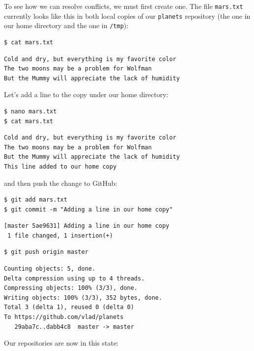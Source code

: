 \documentclass{book}
\begin{document}
To see how we can resolve conflicts, we must first create one. The file
\texttt{mars.txt} currently looks like this in both local copies of our
\texttt{planets} repository (the one in our home directory and the one
in \texttt{/tmp}):

\begin{verbatim}
$ cat mars.txt
\end{verbatim}

\begin{verbatim}
Cold and dry, but everything is my favorite color
The two moons may be a problem for Wolfman
But the Mummy will appreciate the lack of humidity
\end{verbatim}

Let's add a line to the copy under our home directory:

\begin{verbatim}
$ nano mars.txt
$ cat mars.txt
\end{verbatim}

\begin{verbatim}
Cold and dry, but everything is my favorite color
The two moons may be a problem for Wolfman
But the Mummy will appreciate the lack of humidity
This line added to our home copy
\end{verbatim}

and then push the change to GitHub:

\begin{verbatim}
$ git add mars.txt
$ git commit -m "Adding a line in our home copy"
\end{verbatim}

\begin{verbatim}
[master 5ae9631] Adding a line in our home copy
 1 file changed, 1 insertion(+)
\end{verbatim}

\begin{verbatim}
$ git push origin master
\end{verbatim}

\begin{verbatim}
Counting objects: 5, done.
Delta compression using up to 4 threads.
Compressing objects: 100% (3/3), done.
Writing objects: 100% (3/3), 352 bytes, done.
Total 3 (delta 1), reused 0 (delta 0)
To https://github.com/vlad/planets
   29aba7c..dabb4c8  master -> master
\end{verbatim}

Our repositories are now in this state:
\end{document}
